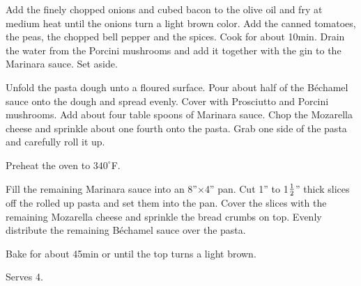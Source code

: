 \documentclass[11pt,twocolumn,a4paper]{article}
\begin{document}
Add the finely chopped onions and cubed bacon to the olive oil and fry
at medium heat until the onions turn a light brown color. Add the
canned tomatoes, the peas, the chopped bell pepper and the spices.
Cook for about 10min. Drain the water from the Porcini mushrooms and
add it together with the gin to the Marinara sauce.  Set aside.

Unfold the pasta dough unto a floured surface. Pour about half of the
B\'echamel sauce onto the dough and spread evenly. Cover with Prosciutto
and Porcini mushrooms. Add about four table spoons of Marinara
sauce. Chop the Mozarella cheese and sprinkle about one fourth onto
the pasta. Grab one side of the pasta and carefully roll it up.

Preheat the oven to $340^{\circ}$F.

Fill the remaining Marinara sauce into an 8''$\times$4'' pan. Cut 1'' to
1$1\over2$'' thick slices off the rolled up pasta and set them into the
pan. Cover the slices with the remaining Mozarella cheese and sprinkle
the bread crumbs on top. Evenly distribute the remaining B\'echamel
sauce over the pasta.

Bake for about 45min or until the top turns a light brown.

Serves 4.
\end{document}
